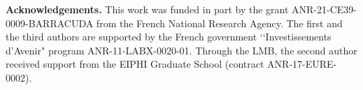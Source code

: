 \documentclass[a4paper]{amsart}
\theoremstyle{definition}
\theoremstyle{remark}
\begin{document}
\noindent
\textbf{Acknowledgements.} %
This work was funded in part by the grant ANR-21-CE39-0009-BARRACUDA from the French National Research Agency. The first and the third authors are supported by the French government ‘‘Investissements d’Avenir" program ANR-11-LABX-0020-01. Through the LMB, the second author received support from the  EIPHI Graduate School (contract ANR-17-EURE-0002).


\clearpage


\end{document}

